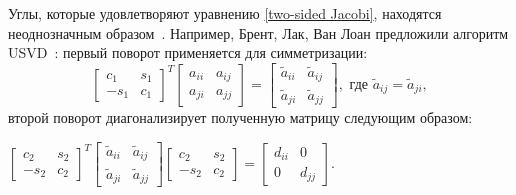 Углы, которые удовлетворяют уравнению \eqref{two-sided Jacobi}, находятся неоднозначным образом~\cite{Dongarra2018}. Например, Брент, Лак, Ван Лоан предложили алгоритм USVD~\cite{10.5555/867597}: первый поворот применяется для симметризации:
\begin{equation}
\begin{bmatrix}
    c_1&s_1\\
    -s_1&c_1
\end{bmatrix}^T
\begin{bmatrix}
    a_{ii}&a_{ij}\\
    a_{ji}&a_{jj}
\end{bmatrix} = 
\begin{bmatrix}
    \tilde{a}_{ii}&\tilde{a}_{ij}\\
    \tilde{a}_{ji}&\tilde{a}_{jj}
\end{bmatrix}, \text{ где } \tilde{a}_{ij} = \tilde{a}_{ji},
\end{equation}
второй поворот диагонализирует полученную матрицу следующим образом: \begin{center}
$\begin{bmatrix}
    c_2&s_2\\
    -s_2&c_2
\end{bmatrix}^T
\begin{bmatrix}
     \tilde{a}_{ii}&\tilde{a}_{ij}\\
    \tilde{a}_{ji}&\tilde{a}_{jj}
\end{bmatrix}
\begin{bmatrix}
    c_2&s_2\\
    -s_2&c_2
\end{bmatrix} = 
\begin{bmatrix}
    d_{ii}&0\\
    0&d_{jj}
\end{bmatrix}.$
\end{center}

